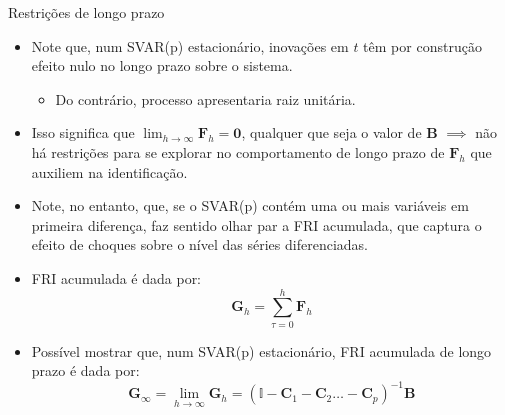 \documentclass[11pt]{beamer}
\begin{document}
\begin{frame}{Restrições de longo prazo}
\begin{itemize}
	\item Note que, num SVAR(p) estacionário, inovações em $t$ têm por construção efeito nulo no longo prazo sobre o sistema.
	\begin{itemize}
		\item Do contrário, processo apresentaria raiz unitária.
	\end{itemize}
	\item Isso significa que $\lim_{h \to \infty} \boldsymbol{F}_h = \boldsymbol{0}$, qualquer que seja o valor de $\boldsymbol{B}$ $\implies$ não há restrições para se explorar no comportamento de longo prazo  de $\boldsymbol{F}_h$ que auxiliem na identificação.
	\item Note, no entanto, que, se o SVAR(p) contém uma ou mais variáveis em {\color{blue}primeira diferença}, faz sentido olhar par a {\color{blue}FRI acumulada}, que captura o efeito de choques sobre {\color{blue}o nível das séries diferenciadas}.
		\item FRI acumulada é dada por:
		$$\boldsymbol{G}_h = \sum_{\tau = 0}^h \boldsymbol{F}_h$$
\item Possível mostrar que, num SVAR(p) estacionário, FRI acumulada de longo prazo é dada por:
$$\boldsymbol{G}_\infty = \lim_{h \to \infty}\boldsymbol{G}_h = (\mathbb{I} - \boldsymbol{C}_1 - \boldsymbol{C}_2 \ldots - \boldsymbol{C}_p)^{-1} \boldsymbol{B}$$
\end{itemize}
\end{frame}
\end{document}

